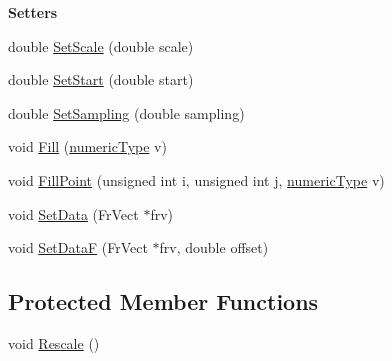 \begin{Indent}\textbf{ Setters}\par
\begin{DoxyCompactItemize}
\item 
double \hyperlink{classtsa_1_1_seq_view_ab231d10dc992831a0b34abecb7d08934}{Set\+Scale} (double scale)
\item 
double \hyperlink{classtsa_1_1_seq_view_a9c1615ded80ed552128b574c78ba182d}{Set\+Start} (double start)
\item 
double \hyperlink{classtsa_1_1_seq_view_a3f7d84e69d6060b6681a4d72e19a4f81}{Set\+Sampling} (double sampling)
\item 
void \hyperlink{classtsa_1_1_seq_view_acc0fd21713e3ec36e90c6ce418bf2518}{Fill} (\hyperlink{classtsa_1_1_seq_view_a72b689db78d0feea3305e62cc3852a1d}{numeric\+Type} v)
\item 
void \hyperlink{classtsa_1_1_seq_view_ac71a511b75253b81a63f9e61c9e5612c}{Fill\+Point} (unsigned int i, unsigned int j, \hyperlink{classtsa_1_1_seq_view_a72b689db78d0feea3305e62cc3852a1d}{numeric\+Type} v)
\item 
void \hyperlink{classtsa_1_1_seq_view_aa9ea4a618201643a56a39878d3395ff4}{Set\+Data} (Fr\+Vect $\ast$frv)
\item 
void \hyperlink{classtsa_1_1_seq_view_a8d806623e7b3bcf1642a7efa142c07e0}{Set\+DataF} (Fr\+Vect $\ast$frv, double offset)
\end{DoxyCompactItemize}
\end{Indent}
\subsection*{Protected Member Functions}
\begin{DoxyCompactItemize}
\item 
void \hyperlink{classtsa_1_1_seq_view_a400883f9563926797fdfe3e0fd89faa9}{Rescale} ()
\end{DoxyCompactItemize}
